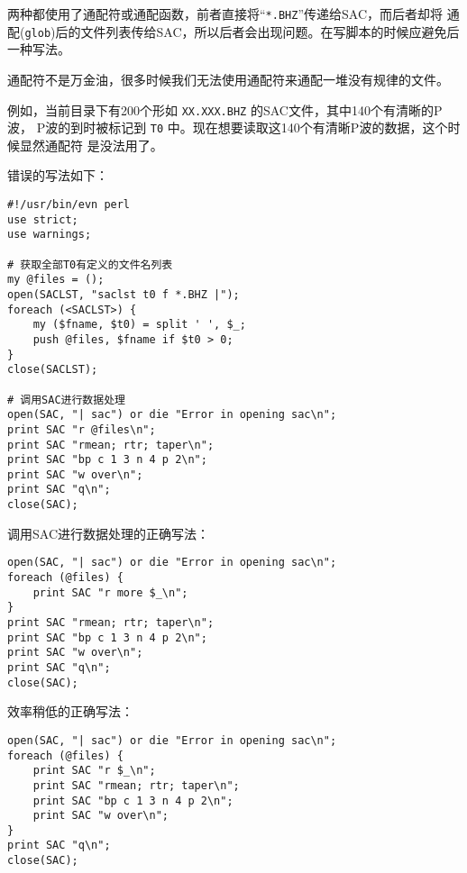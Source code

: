 两种都使用了通配符或通配函数，前者直接将``\texttt{*.BHZ}''传递给SAC，而后者却将
通配(\texttt{glob})后的文件列表传给SAC，所以后者会出现问题。在写脚本的时候应避免后
一种写法。

通配符不是万金油，很多时候我们无法使用通配符来通配一堆没有规律的文件。

例如，当前目录下有200个形如 \texttt{XX.XXX.BHZ} 的SAC文件，其中140个有清晰的P波，
P波的到时被标记到 \texttt{T0} 中。现在想要读取这140个有清晰P波的数据，这个时候显然通配符
是没法用了。

错误的写法如下：
\begin{verbatim}
#!/usr/bin/evn perl
use strict;
use warnings;

# 获取全部T0有定义的文件名列表
my @files = ();
open(SACLST, "saclst t0 f *.BHZ |");
foreach (<SACLST>) {
    my ($fname, $t0) = split ' ', $_;
    push @files, $fname if $t0 > 0;
}
close(SACLST);

# 调用SAC进行数据处理
open(SAC, "| sac") or die "Error in opening sac\n";
print SAC "r @files\n";
print SAC "rmean; rtr; taper\n";
print SAC "bp c 1 3 n 4 p 2\n";
print SAC "w over\n";
print SAC "q\n";
close(SAC);
\end{verbatim}

调用SAC进行数据处理的正确写法：
\begin{verbatim}
open(SAC, "| sac") or die "Error in opening sac\n";
foreach (@files) {
    print SAC "r more $_\n";
}
print SAC "rmean; rtr; taper\n";
print SAC "bp c 1 3 n 4 p 2\n";
print SAC "w over\n";
print SAC "q\n";
close(SAC);
\end{verbatim}

效率稍低的正确写法：
\begin{verbatim}
open(SAC, "| sac") or die "Error in opening sac\n";
foreach (@files) {
    print SAC "r $_\n";
    print SAC "rmean; rtr; taper\n";
    print SAC "bp c 1 3 n 4 p 2\n";
    print SAC "w over\n";
}
print SAC "q\n";
close(SAC);
\end{verbatim}